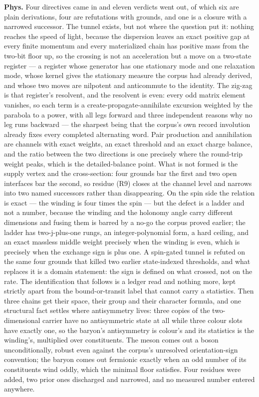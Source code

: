 \documentclass[11pt,openany]{report}
\theoremstyle{canonplain}
\theoremstyle{canondef}
\begin{document}
\textbf{Phys.} Four directives came in and eleven verdicts went out, of which six are plain derivations, four are refutations with grounds, and one is a closure with a narrowed successor. The tunnel exists, but not where the question put it: nothing reaches the speed of light, because the dispersion leaves an exact positive gap at every finite momentum and every materialized chain has positive mass from the two-bit floor up, so the crossing is not an acceleration but a move on a two-state register — a register whose generator has one stationary mode and one relaxation mode, whose kernel gives the stationary measure the corpus had already derived, and whose two moves are nilpotent and anticommute to the identity. The zig-zag is that register's resolvent, and the resolvent is even: every odd matrix element vanishes, so each term is a create-propagate-annihilate excursion weighted by the parabola to a power, with all legs forward and three independent reasons why no leg runs backward — the sharpest being that the corpus's own record involution already fixes every completed alternating word. Pair production and annihilation are channels with exact weights, an exact threshold and an exact charge balance, and the ratio between the two directions is one precisely where the round-trip weight peaks, which is the detailed-balance point. What is not formed is the supply vertex and the cross-section: four grounds bar the first and two open interfaces bar the second, so residue (R9) closes at the channel level and narrows into two named successors rather than disappearing. On the spin side the relation is exact — the winding is four times the spin — but the defect is a ladder and not a number, because the winding and the holonomy angle carry different dimensions and fusing them is barred by a no-go the corpus proved earlier; the ladder has two-j-plus-one rungs, an integer-polynomial form, a hard ceiling, and an exact massless middle weight precisely when the winding is even, which is precisely when the exchange sign is plus one. A spin-gated tunnel is refuted on the same four grounds that killed two earlier state-indexed thresholds, and what replaces it is a domain statement: the sign is defined on what crossed, not on the rate. The identification that follows is a ledger read and nothing more, kept strictly apart from the bound-or-transit label that cannot carry a statistics. Then three chains get their space, their group and their character formula, and one structural fact settles where antisymmetry lives: three copies of the two-dimensional carrier have no antisymmetric state at all while three colour slots have exactly one, so the baryon's antisymmetry is colour's and its statistics is the winding's, multiplied over constituents. The meson comes out a boson unconditionally, robust even against the corpus's unresolved orientation-sign convention; the baryon comes out fermionic exactly when an odd number of its constituents wind oddly, which the minimal floor satisfies. Four residues were added, two prior ones discharged and narrowed, and no measured number entered anywhere.
\end{document}
